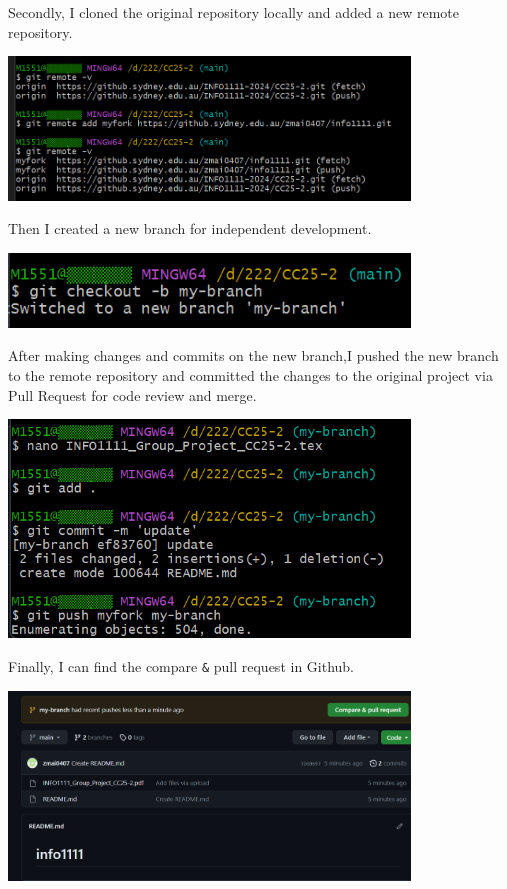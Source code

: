 \documentclass[a4paper, 11pt]{report}
\begin{document}
\noindent Secondly, I cloned the original repository locally and added a new remote repository.
\begin{center}
	\includegraphics[width=0.8\textwidth, keepaspectratio]{repository_ingit}
\end{center}


\noindent Then I created a new branch for independent development. 
\begin{center}
	\includegraphics[width=0.8\textwidth, keepaspectratio]{addnewbramch}
\end{center}


\noindent After making changes and commits on the new branch,I pushed the new branch to the remote repository and committed the changes to the original project via Pull Request for code review and merge.
\begin{center}
	\includegraphics[width=0.8\textwidth, keepaspectratio]{pushnewchange}
\end{center}


\noindent Finally, I can find the compare \verb|&| pull request in Github.
\begin{center}
	\includegraphics[width=0.8\textwidth, keepaspectratio]{Compareandpullrequest}
\end{center}
\end{document}
